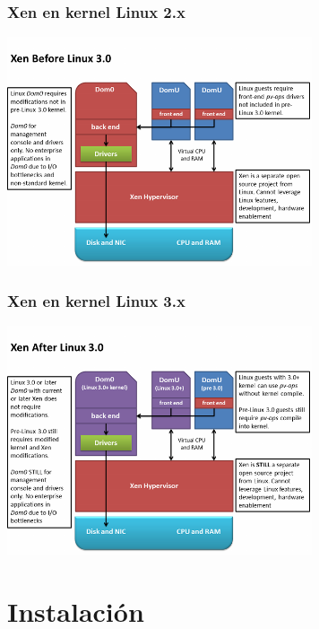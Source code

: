 \documentclass{beamer}
\begin{document}

\begin{frame}
\frametitle{Xen en kernel Linux 2.x}
\begin{center}
\includegraphics[width=9cm]{figs/xen-old-kernels.png}
\end{center}
\end{frame}


\begin{frame}
\frametitle{Xen en kernel Linux 3.x}
\begin{center}
\includegraphics[width=9cm]{figs/xen-new-kernel.png}
\end{center}
\end{frame}



\section{Instalación}
\end{document}
